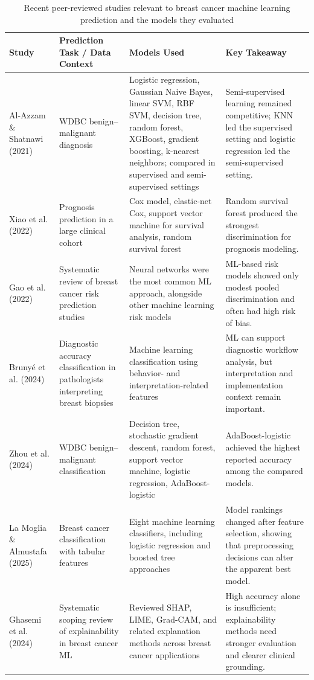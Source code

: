 \documentclass[conference]{IEEEtran}
\begin{document}
\begin{table}[t]
\caption{Recent peer-reviewed studies relevant to breast cancer machine learning prediction and the models they evaluated}
\label{tab:lit_summary}
\centering
\footnotesize
\begin{tabularx}{\textwidth}{p{2.8cm} p{2.7cm} p{5.3cm} p{4.2cm}}
\toprule
\textbf{Study} & \textbf{Prediction Task / Data Context} & \textbf{Models Used} & \textbf{Key Takeaway} \\
\midrule
Al-Azzam \& Shatnawi (2021) & WDBC benign--malignant diagnosis & Logistic regression, Gaussian Naive Bayes, linear SVM, RBF SVM, decision tree, random forest, XGBoost, gradient boosting, k-nearest neighbors; compared in supervised and semi-supervised settings & Semi-supervised learning remained competitive; KNN led the supervised setting and logistic regression led the semi-supervised setting. \\
\addlinespace
Xiao et al. (2022) & Prognosis prediction in a large clinical cohort & Cox model, elastic-net Cox, support vector machine for survival analysis, random survival forest & Random survival forest produced the strongest discrimination for prognosis modeling. \\
\addlinespace
Gao et al. (2022) & Systematic review of breast cancer risk prediction studies & Neural networks were the most common ML approach, alongside other machine learning risk models & ML-based risk models showed only modest pooled discrimination and often had high risk of bias. \\
\addlinespace
Bruny\'e et al. (2024) & Diagnostic accuracy classification in pathologists interpreting breast biopsies & Machine learning classification using behavior- and interpretation-related features & ML can support diagnostic workflow analysis, but interpretation and implementation context remain important. \\
\addlinespace
Zhou et al. (2024) & WDBC benign--malignant classification & Decision tree, stochastic gradient descent, random forest, support vector machine, logistic regression, AdaBoost-logistic & AdaBoost-logistic achieved the highest reported accuracy among the compared models. \\
\addlinespace
La Moglia \& Almustafa (2025) & Breast cancer classification with tabular features & Eight machine learning classifiers, including logistic regression and boosted tree approaches & Model rankings changed after feature selection, showing that preprocessing decisions can alter the apparent best model. \\
\addlinespace
Ghasemi et al. (2024) & Systematic scoping review of explainability in breast cancer ML & Reviewed SHAP, LIME, Grad-CAM, and related explanation methods across breast cancer applications & High accuracy alone is insufficient; explainability methods need stronger evaluation and clearer clinical grounding. \\
\bottomrule
\end{tabularx}
\end{table}
\end{document}
